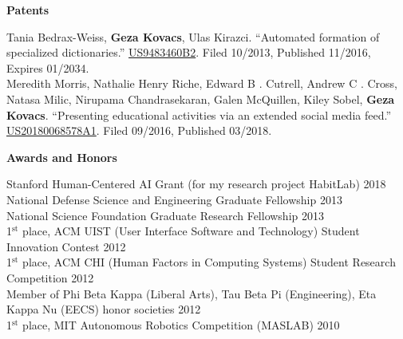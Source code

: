 \documentclass[10pt,A4]{article}
\newcommand{\cvsection}[1]
{
	\begin{center}
		\large\textcolor{sectcol}{\textbf{#1}}
	\end{center}
}
\begin{document}
\pagebreak

\cvsection{Patents}

Tania Bedrax-Weiss, \textbf{Geza Kovacs}, Ulas Kirazci. ``Automated formation of specialized dictionaries.'' \href{https://patents.google.com/patent/US9483460B2}{US9483460B2}. Filed 10/2013, Published 11/2016, Expires 01/2034.\\

Meredith Morris, Nathalie Henry Riche, Edward B . Cutrell, Andrew C . Cross, Natasa Milic, Nirupama Chandrasekaran, Galen McQuillen, Kiley Sobel, \textbf{Geza Kovacs}. ``Presenting educational activities via an extended social media feed.'' \href{https://patents.google.com/patent/US20180068578A1}{US20180068578A1}. Filed 09/2016, Published 03/2018.\\

\cvsection{Awards and Honors}

Stanford Human-Centered AI Grant (for my research project HabitLab) \hfill \textcolor{sectcol}{2018}\\ %
National Defense Science and Engineering Graduate Fellowship \hfill \textcolor{sectcol}{2013}\\ %
National Science Foundation Graduate Research Fellowship \hfill \textcolor{sectcol}{2013}\\ %
1$^{\textrm{st}}$ place, ACM UIST (User Interface Software and Technology) Student Innovation Contest \hfill \textcolor{sectcol}{2012}\\
1$^{\textrm{st}}$ place, ACM CHI (Human Factors in Computing Systems) Student Research Competition \hfill \textcolor{sectcol}{2012}\\
Member of Phi Beta Kappa (Liberal Arts), Tau Beta Pi (Engineering), Eta Kappa Nu (EECS) honor societies \hfill \textcolor{sectcol}{2012}\\
1$^{\textrm{st}}$ place, MIT Autonomous Robotics Competition (MASLAB) \hfill \textcolor{sectcol}{2010}\\
\end{document}
